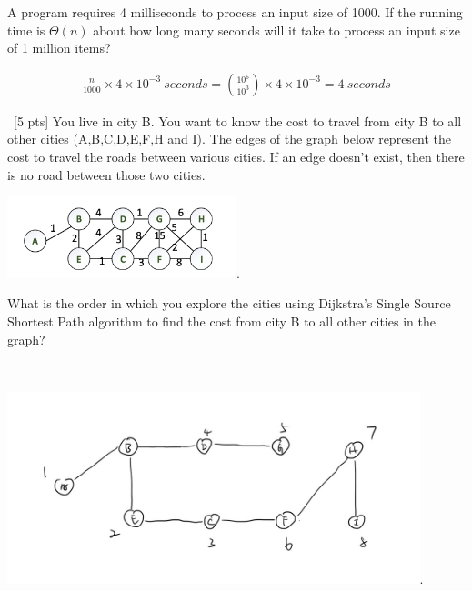 \documentclass[12pt]{article}
\newenvironment{sol}[1][Solution]{\begin{trivlist}\item[\hskip\labelsep {\bfseries #1:}]}{\end{trivlist}}
\begin{document}
\begin{enumerate}
\begin{enumerate}
            \item A program requires 4 milliseconds to process an input size of 1000. If the running time is $\Theta(n)$ about how long many seconds will it take to process an input size of 1 million items?
            \begin{sol}
                            \begin{sol}
                \begin{align*}
                    \frac{n}{1000} \times 4 \times 10^{-3} \ seconds = (\frac{10^6}{10^3}) \times 4 \times 10^{-3} = 4 \  seconds 
                \end{align*}
            \end{sol}
            \end{sol}
        \end{enumerate} 

        \item \  [5 pts] You live in city B. You want to know the cost to travel from city B to all other cities (A,B,C,D,E,F,H and I). The edges of the graph below represent the cost to travel the roads between various cities. If an edge doesn’t exist, then there is no road between those two cities.
        \begin{center}
        \includegraphics[width=0.5\textwidth]{p7.png}.
         \end{center}
         What is the order in which you explore the cities using Dijkstra’s Single Source
Shortest Path algorithm to find the cost from city B to all other cities in the graph?
        \begin{sol}
        \hspace{\fill}\\
                    \begin{center}
        \includegraphics[width=0.9\textwidth]{p8.jpg}.
        

\end{center}
\end{sol}
\end{enumerate}
\end{document}
